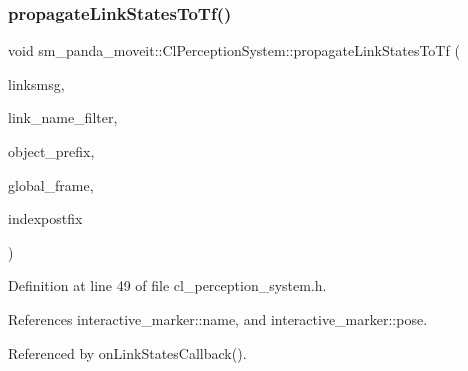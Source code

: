 \mbox{\label{classsm__panda__moveit_1_1ClPerceptionSystem_a0c02770eff276808972e341c939a9e97}} 
\subsubsection{\texorpdfstring{propagate\+Link\+States\+To\+Tf()}{propagateLinkStatesToTf()}}
{\footnotesize\ttfamily void sm\+\_\+panda\+\_\+moveit\+::\+Cl\+Perception\+System\+::propagate\+Link\+States\+To\+Tf (\begin{DoxyParamCaption}\item[{const gazebo\+\_\+msgs\+::\+Link\+States \&}]{linksmsg,  }\item[{std\+::string}]{link\+\_\+name\+\_\+filter,  }\item[{std\+::string}]{object\+\_\+prefix,  }\item[{std\+::string}]{global\+\_\+frame,  }\item[{\hyperlink{classbool}{bool}}]{indexpostfix }\end{DoxyParamCaption})\hspace{0.3cm}{\ttfamily [inline]}}



Definition at line 49 of file cl\+\_\+perception\+\_\+system.\+h.



References interactive\+\_\+marker\+::name, and interactive\+\_\+marker\+::pose.



Referenced by on\+Link\+States\+Callback().


